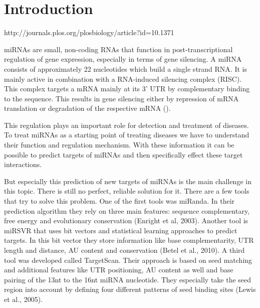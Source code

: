 \documentclass[12pt]{article}
\begin{document}
\tableofcontents

\newpage 
{}




%


\section{Introduction}

http://journals.plos.org/plosbiology/article?id=10.1371%


miRNAs are small, non-coding RNAs that function in post-transcriptional regulation of gene expression, especially in terms of gene silencing. A miRNA consists of approximately 22 nucleotides which build a single strand RNA. It is mainly active in combination with a RNA-induced silencing complex (RISC). This complex targets a mRNA mainly at its 3' UTR by complementary binding to the sequence. This results in gene silencing either by repression of mRNA translation or degradation of the respective mRNA (\cite{Enright}). 

This regulation plays an important role for detection and treatment of diseases. To treat miRNAs as a starting point of treating diseases we have to understand their function and regulation mechanism. With these information it can be possible to predict targets of miRNAs and then specifically effect these target interactions. 

But especially this prediction of new targets of miRNAs is the main challenge in this topic. There is still no perfect, reliable solution for it. There are a few tools that try to solve this problem. One of the first tools was miRanda. In their prediction algorithm they rely on three main features: sequence complementary, free energy and evolutionary conservation (Enright et al, 2003). Another tool is miRSVR that uses bit vectors and statistical learning approaches to predict targets. In this bit vector they store information like base complementarity, UTR length and distance, AU content and conservation (Betel et al., 2010). A third tool was developed called TargetScan. Their approach is based on seed matching and additional features like UTR positioning, AU content as well and base pairing of the 13nt to the 16nt miRNA nucleotide. They especially take the seed region into account by defining four different patterns of seed binding sites (Lewis et al., 2005).
\end{document}

